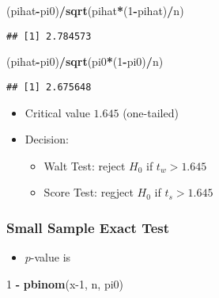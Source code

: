 \documentclass[
]{article}
\newenvironment{Shaded}{\begin{snugshade}}{\end{snugshade}}
\newcommand{\DecValTok}[1]{\textcolor[rgb]{0.00,0.00,0.81}{#1}}
\newcommand{\FunctionTok}[1]{\textcolor[rgb]{0.13,0.29,0.53}{\textbf{#1}}}
\newcommand{\NormalTok}[1]{#1}
\newcommand{\SpecialCharTok}[1]{\textcolor[rgb]{0.81,0.36,0.00}{\textbf{#1}}}
\providecommand{\tightlist}{%
  \setlength{\itemsep}{0pt}\setlength{\parskip}{0pt}}
\begin{document}
\begin{Shaded}
\begin{Highlighting}[]
\NormalTok{(pihat}\SpecialCharTok{{-}}\NormalTok{pi0)}\SpecialCharTok{/}\FunctionTok{sqrt}\NormalTok{(pihat}\SpecialCharTok{*}\NormalTok{(}\DecValTok{1}\SpecialCharTok{{-}}\NormalTok{pihat)}\SpecialCharTok{/}\NormalTok{n)}
\end{Highlighting}
\end{Shaded}

\begin{verbatim}
## [1] 2.784573
\end{verbatim}

\begin{Shaded}
\begin{Highlighting}[]
\NormalTok{(pihat}\SpecialCharTok{{-}}\NormalTok{pi0)}\SpecialCharTok{/}\FunctionTok{sqrt}\NormalTok{(pi0}\SpecialCharTok{*}\NormalTok{(}\DecValTok{1}\SpecialCharTok{{-}}\NormalTok{pi0)}\SpecialCharTok{/}\NormalTok{n)}
\end{Highlighting}
\end{Shaded}

\begin{verbatim}
## [1] 2.675648
\end{verbatim}

\begin{itemize}
\tightlist
\item
  Critical value \(1.645\) (one-tailed)
\item
  Decision:

  \begin{itemize}
  \tightlist
  \item
    Walt Test: reject \(H_0\) if \(t_w > 1.645\)
  \item
    Score Test: regject \(H_0\) if \(t_s > 1.645\)
  \end{itemize}
\end{itemize}

\hypertarget{small-sample-exact-test}{%
\subsubsection{Small Sample Exact Test}\label{small-sample-exact-test}}

\begin{itemize}
\tightlist
\item
  \(p\)-value is
\end{itemize}

\begin{Shaded}
\begin{Highlighting}[]
\DecValTok{1} \SpecialCharTok{{-}} \FunctionTok{pbinom}\NormalTok{(x}\DecValTok{{-}1}\NormalTok{, n, pi0)}
\end{Highlighting}
\end{Shaded}
\end{document}
